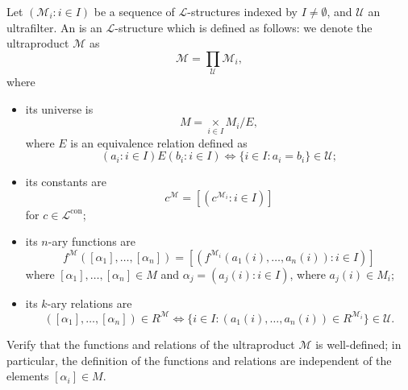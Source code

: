 \documentclass[notoc,notitlepage]{tufte-book}
\DeclareMathOperator{\con}{con}
\begin{document}
\begin{defn}[Ultraproduct]\label{defn:ultraproduct}
  Let $(\mathcal{M}_i : i \in I)$ be a sequence of $\mathcal{L}$-structures indexed by $I \neq \emptyset$, and $\mathcal{U}$ an ultrafilter. An  is an $\mathcal{L}$-structure which is defined as follows: we denote the ultraproduct $\mathcal{M}$ as
  \begin{equation*}
    \mathcal{M} = \prod_{\mathcal{U}} \mathcal{M}_i,
  \end{equation*}
  where
  \begin{itemize}
    \item its universe is
      \begin{equation*}
        M = \underset{i \in I}{\times} M_i / E,
      \end{equation*}
      where $E$ is an equivalence relation defined as
      \begin{equation*}
        (a_i : i \in I) E (b_i : i \in I) \iff \{ i \in I : a_i = b_i \} \in \mathcal{U};
      \end{equation*}
    \item its constants are
      \begin{equation*}
        c^\mathcal{M} = [( c^{\mathcal{M}_i} : i \in I )]
      \end{equation*}
      for $c \in \mathcal{L}^{\con}$;
    \item its $n$-ary functions are
      \begin{equation*}
        f^\mathcal{M} ( [ \alpha_1 ], \ldots, [ \alpha_n ] ) = [ ( f^{\mathcal{M}_i}( a_1(i), \ldots, a_n(i) ) : i \in I ) ]
      \end{equation*}
      where $[\alpha_1], \ldots, [\alpha_n] \in M$ and $\alpha_j = ( a_j(i) : i \in I )$, where $a_j(i) \in M_i$;
    \item its $k$-ary relations are
      \begin{equation*}
        ( [ \alpha_1 ], \ldots, [ \alpha_n ] ) \in R^\mathcal{M} \iff \{ i \in I : ( a_1(i), \ldots, a_n(i) ) \in R^{\mathcal{M}_i} \} \in \mathcal{U}.
      \end{equation*}
  \end{itemize}
\end{defn}

\begin{ex}
  Verify that the functions and relations of the ultraproduct $\mathcal{M}$ is well-defined; in particular, the definition of the functions and relations are independent of the elements $[\alpha_i] \in M$.
\end{ex}
\end{document}
